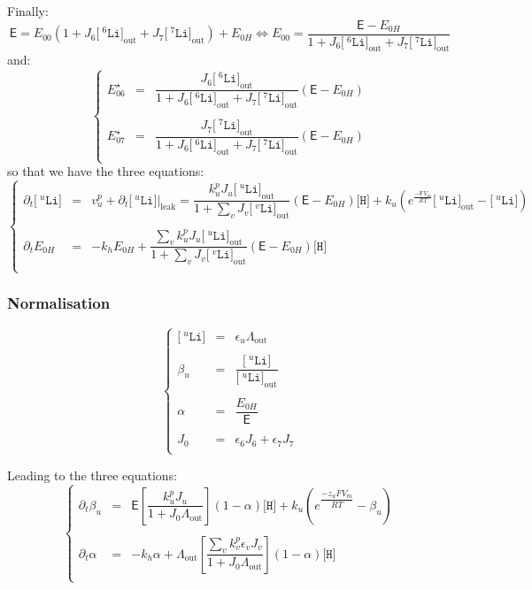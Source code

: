 \documentclass[aps,onecolumn,11pt]{revtex4}
\newcommand{\mychem}[1]{\mathtt{#1}}
\newcommand{\myconc}[1]{\big[#1\big]}
\newcommand{\Faraday}{\mathrm{F}}
\newcommand{\spLi}[1]{{\!~^{#1}\mychem{Li}}}
\newcommand{\Li}[1]{\myconc{\spLi{#1}}}
\newcommand{\spproton}{\mychem{H}}
\newcommand{\proton}{\myconc{\spproton}}
\newcommand{\myleak}[1]{\left.{#1}\right\vert_{\mathrm{leak}}}
\newcommand{\myout}[1]{{#1}_{\mathrm{out}}}
\newcommand{\LiOut}[1]{\myout{\Li{#1}}}
\newcommand{\LiAll}{\Lambda}
\newcommand{\LiAllOut}{\myout{\LiAll}}
\begin{document}
Finally:
\begin{equation}
\mathsf{E} = E_{00}\left(1+J_6\LiOut{6}+J_7\LiOut{7}\right) + E_{0H} \Leftrightarrow E_{00} = \dfrac{\mathsf{E}-E_{0H}}{1+J_6\LiOut{6}+J_7\LiOut{7}}
\end{equation}
and:
\begin{equation}
\left\lbrace
\begin{array}{rcl}
	E_{06}^\star & = & \dfrac{J_6\LiOut{6}}{1+J_6\LiOut{6}+J_7\LiOut{7}} \left(\mathsf{E}-E_{0H}\right)\\
	\\
	E_{07}^\star & = & \dfrac{J_7\LiOut{7}}{1+J_6\LiOut{6}+J_7\LiOut{7}} \left(\mathsf{E}-E_{0H}\right)\\
\end{array}
\right.
\end{equation}
so that we have the three equations:
\begin{equation}
\left\lbrace
\begin{array}{rcl}
	\partial_t \Li{u}  & = & v^p_u +\partial_t \myleak{\Li{u}}  = \dfrac{k^p_u J_u \LiOut{u}}{1+\sum_v J_v \LiOut{v}} \left(\mathsf{E}-E_{0H}\right) \proton + k_u \left( e^{\frac{-\Faraday V_m }{RT}} \LiOut{u} - \Li{u}\right) \\
	\\
	\partial_t E_{0H} & = & -k_h E_{0H} + \dfrac{\sum_v k^p_u J_u \LiOut{u}}{1+\sum_v J_v \LiOut{v}} \left(\mathsf{E}-E_{0H}\right) \proton \\
\end{array}
\right.
\end{equation}
\subsubsection{Normalisation}
\begin{equation}
\left\lbrace
\begin{array}{rcl}
	\Li{u} & = & \epsilon_u \LiAllOut\\
	\\
	\beta_u & = & \dfrac{\Li{u}}{\LiOut{u}}\\
	\\
	\alpha  & = & \dfrac{E_{0H}}{\mathsf{E}}\\
	\\
	J_0 & = & \epsilon_6 J_6  + \epsilon_7 J_7 \\
\end{array}
\right.
\end{equation}

Leading to the three equations:
\begin{equation}
\left\lbrace
\begin{array}{rcl}
	\partial_t \beta_u & = & \mathsf{E} \left[\dfrac{k^p_u J_u}{1+J_0 \LiAllOut}\right] \left(1-\alpha\right) \proton
	 + k_u \left( e^{\dfrac{-z_u F V_m }{RT}}- \beta_u\right)\\
	\\
	\partial_t \alpha  & = &  -k_h\alpha + \LiAllOut \left[\dfrac{ \sum_v k^p_v \epsilon_v J_v}{1+J_0\LiAllOut}\right] \left(1-\alpha\right) \proton\\
\end{array}
\right.
\end{equation}
\end{document}
